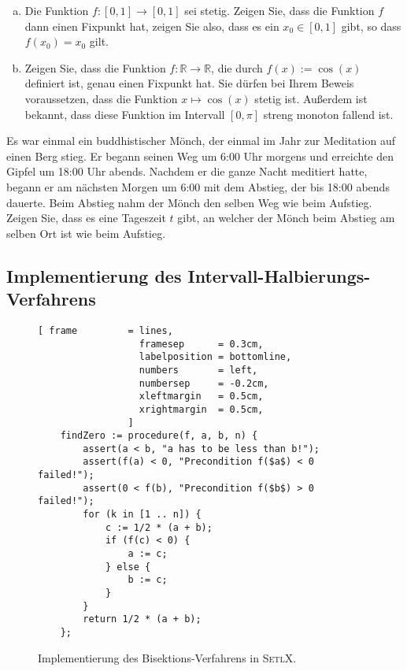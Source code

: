 \exercise
\begin{enumerate}[(a)]
\item Die Funktion $f:[0,1] \rightarrow [0,1]$ sei stetig.  Zeigen Sie, dass die Funktion $f$ dann
      einen Fixpunkt hat, zeigen Sie also, dass es ein $x_0 \in [0,1]$ gibt, so dass
      \\[0.2cm]
      \hspace*{1.3cm}
      $f(x_0) = x_0$ \quad gilt.
      \pagebreak

\item Zeigen Sie, dass die Funktion $f: \mathbb{R} \rightarrow \mathbb{R}$, die durch $f(x) := \cos(x)$
      definiert ist, genau einen Fixpunkt hat.  Sie d\"urfen bei Ihrem Beweis voraussetzen, dass die
      Funktion $x \mapsto \cos(x)$ stetig ist.  Au{\ss}erdem ist bekannt, dass diese Funktion im Intervall 
      $[0, \pi]$ streng monoton fallend ist.
      \eox
\end{enumerate}

\exercise
Es war einmal ein buddhistischer M\"onch, der einmal im Jahr zur Meditation auf einen Berg stieg.
Er begann seinen Weg um 6:00 Uhr morgens und erreichte den Gipfel um 18:00 Uhr abends.  Nachdem er
die ganze Nacht meditiert hatte, begann er am n\"achsten Morgen um 6:00 mit dem Abstieg, der bis 18:00
abends dauerte.  Beim Abstieg nahm der M\"onch den selben Weg wie beim Aufstieg.  Zeigen Sie, dass es
eine Tageszeit $t$ gibt, an welcher der M\"onch beim Abstieg am selben Ort ist wie beim Aufstieg. 
\eox
 
\subsection{Implementierung des Intervall-Halbierungs-Verfahrens}

\begin{figure}[!ht]
  \centering
\begin{Verbatim}[ frame         = lines, 
                  framesep      = 0.3cm, 
                  labelposition = bottomline,
                  numbers       = left,
                  numbersep     = -0.2cm,
                  xleftmargin   = 0.5cm,
                  xrightmargin  = 0.5cm,
                ]
    findZero := procedure(f, a, b, n) {
        assert(a < b, "a has to be less than b!");   
        assert(f(a) < 0, "Precondition f($a$) < 0 failed!");
        assert(0 < f(b), "Precondition f($b$) > 0 failed!");
        for (k in [1 .. n]) {
            c := 1/2 * (a + b); 
            if (f(c) < 0) {
                a := c; 
            } else {
                b := c; 
            }
        }
        return 1/2 * (a + b);
    };
\end{Verbatim}
\vspace*{-0.3cm}
  \caption{Implementierung des Bisektions-Verfahrens in \textsc{SetlX}.}
  \label{fig:bisection.setlx}
\end{figure} %

